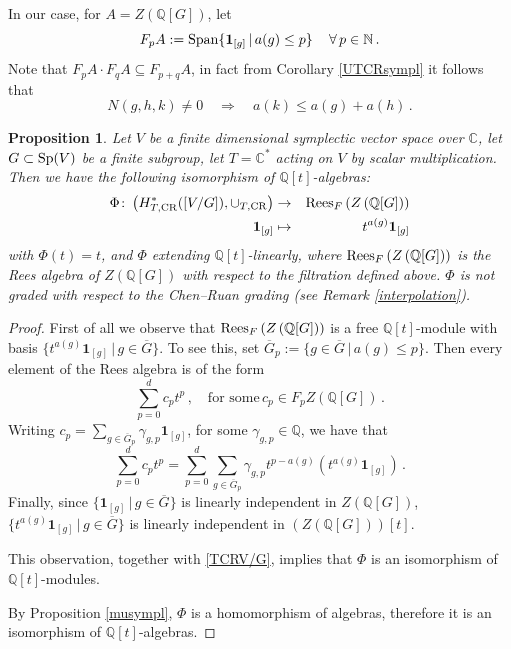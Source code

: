 \documentclass[a4paper,reqno]{amsart}
\theoremstyle{plain} %
\newtheorem{prop}[thm]{Proposition}
\theoremstyle{definition} %
\theoremstyle{remark} %
\newcommand{\N}{\mathbb{N}}
\newcommand{\Q}{\mathbb{Q}}
\newcommand{\C}{\mathbb{C}}
\newcommand{\fo}{\mathbf{1}}
\newcommand{\1}{\mathds{1}}   %
\begin{document}
In our case, for $A=Z\left( \Q[G]\right)$, let
$$
F_pA:= {\rm Span}\{ \fo_{[g]} \, | \, a(g)\leq p \} \, \quad \forall \, p \in \N \, .
$$
Note that $F_pA \cdot F_qA \subseteq F_{p+q}A$, in fact from Corollary \ref{UTCRsympl} it follows that 
$$
N(g,h,k) \not= 0 \quad \Rightarrow \quad a(k) \leq a(g)+a(h) \, .
$$

\begin{prop}\label{TCR=Rees}
Let $V$ be a finite dimensional symplectic vector space over $\C$, let $G \subset {\rm Sp}(V)$ be a finite subgroup,
let $T=\C^*$ acting on $V$ by scalar multiplication. Then we have the following isomorphism of $\Q[t]$-algebras:
\begin{eqnarray*}
\Phi \colon \left( H_{T, {\rm CR}}^*([V/G]), \cup_{T, {\rm CR}} \right) &\to& {\rm Rees}_F \left( Z\left( \Q[G] \right) \right) \\
\fo_{[g]} &\mapsto & t^{a(g)} \fo_{[g]}
\end{eqnarray*}
with $\Phi(t)=t$, and \(\Phi\) extending \(\mathbb Q[t]\)-linearly,
where ${\rm Rees}_F \left( Z\left( \Q[G] \right) \right)$ is the Rees algebra of $Z\left( \Q[G] \right)$ with respect to the filtration
defined above.
$\Phi$ is not graded with respect to the Chen–Ruan grading (see Remark \ref{interpolation}).
\end{prop}
\begin{proof}
First of all we observe that ${\rm Rees}_F \left( Z\left( \Q[G] \right) \right)$
is a free $\Q[t]$-module with basis $\{ t^{a(g)}\fo_{[g]} \, | \, g\in \overline{G}\}$.
To see this, set $\overline{G}_p:= \{ g\in \overline{G} \, | \, a(g)\leq p \}$.
Then every element of the Rees algebra is of the  form 
$$
\sum_{p=0}^d c_pt^p \, , \quad \mbox{for some} \, c_p\in F_pZ\left( \Q[G] \right) \, .
$$
Writing $c_p=\sum_{g\in \overline{G}_p} \gamma_{g, p} \fo_{[g]}$, for some $\gamma_{g, p}\in \Q$, we have that
$$
\sum_{p=0}^d c_pt^p = \sum_{p=0}^d \sum_{g\in \overline{G}_p} \gamma_{g, p}t^{p-a(g)} \left( t^{a(g)} \fo_{[g]} \right) \, .
$$
Finally, since $\{ \fo_{[g]} \, | \, g\in \overline{G}\}$ is linearly independent in $Z\left( \Q[G] \right)$,
$\{ t^{a(g)}\fo_{[g]} \, | \, g\in \overline{G}\}$ is linearly independent in $\left( Z\left( \Q[G] \right)\right) [t]$.

This observation, together with \eqref{TCRV/G}, implies that $\Phi$ is an isomorphism of $\Q[t]$-modules. 

By Proposition \ref{musympl}, $\Phi$ is a homomorphism of algebras, therefore it is an isomorphism of $\Q[t]$-algebras. 
\end{proof}
\end{document}

